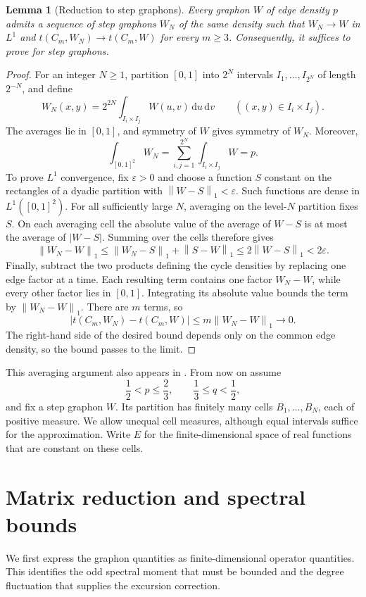 \documentclass[11pt]{article}
\numberwithin{equation}{section}
\newtheorem{lemma}[theorem]{Lemma}
\newcommand{\norm}[1]{\left\lVert #1\right\rVert}
\newcommand{\dd}{\,\mathrm d}
\begin{document}
\begin{lemma}[Reduction to step graphons]\label{lem:step-reduction}
Every graphon $W$ of edge density $p$ admits a sequence of step
graphons $W_N$ of the same density such that $W_N\to W$ in $L^1$
and $t(C_m,W_N)\to t(C_m,W)$ for every $m\ge3$.
Consequently, it suffices to prove  for step graphons.
\end{lemma}
\begin{proof}
For an integer $N\ge1$, partition $[0,1]$ into $2^N$ intervals
$I_1,\ldots,I_{2^N}$ of length $2^{-N}$, and define
\[
 W_N(x,y)=2^{2N}\int_{I_i\times I_j}W(u,v)\dd u\dd v
 \qquad((x,y)\in I_i\times I_j).
\]
The averages lie in $[0,1]$, and symmetry of $W$ gives symmetry
of $W_N$. Moreover,
\[
 \int_{[0,1]^2}W_N
  =\sum_{i,j=1}^{2^N}\int_{I_i\times I_j}W=p.
\]
To prove $L^1$ convergence, fix $\varepsilon>0$ and choose a
function $S$ constant on the rectangles of a dyadic partition
with $\norm{W-S}_1<\varepsilon$. Such functions are dense in
$L^1([0,1]^2)$. For all sufficiently large $N$, averaging on the
level-$N$ partition fixes $S$. On each averaging cell the absolute
value of the average of $W-S$ is at most the average of $|W-S|$.
Summing over the cells therefore gives
\[
 \norm{W_N-W}_1\le\norm{W_N-S}_1+\norm{S-W}_1
  \le2\norm{W-S}_1<2\varepsilon.
\]
Finally, subtract the two products defining the cycle densities by
replacing one edge factor at a time. Each resulting term contains
one factor $W_N-W$, while every other factor lies in $[0,1]$.
Integrating its absolute value bounds the term by $\norm{W_N-W}_1$.
There are $m$ terms, so
\begin{equation}\label{eq:continuity}
 |t(C_m,W_N)-t(C_m,W)|\le m\norm{W_N-W}_1\longrightarrow0.
\end{equation}
The right-hand side of the desired bound depends only on the common
edge density, so the bound passes to the limit.
\end{proof}
This averaging argument also appears in
\cite[Lemma~2.1 and Appendix~A]{kim2026goodman}.
From now on assume
\begin{equation}\label{eq:range}
 \frac12<p\le\frac23,\qquad \frac13\le q<\frac12,
\end{equation}
and fix a step graphon $W$. Its partition has finitely many cells
$B_1,\ldots,B_N$, each of positive measure. We allow unequal cell
measures, although equal intervals suffice for the approximation.
Write $E$ for the finite-dimensional space of real functions that
are constant on these cells.

\section{Matrix reduction and spectral bounds}\label{sec:blocks}
We first express the graphon quantities as finite-dimensional
operator quantities. This identifies the odd spectral moment that
must be bounded and the degree fluctuation that supplies the
excursion correction.
\end{document}
